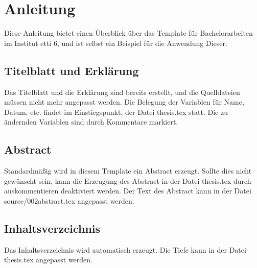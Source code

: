 \chapter{Anleitung} 

Diese Anleitung bietet einen Überblick über das Template für Bachelorarbeiten im Institut etti 6, und ist selbst ein Beispiel für die Anwendung Dieser. 

\section{Titelblatt und Erklärung}\label{Titelblatt und Erklärung}

Das Titelblatt und die Erklärung sind bereits erstellt, und die Quelldateien müssen nicht mehr angepasst werden. Die Belegung der Variablen für Name, Datum, etc. findet im Einstiegspunkt, der Datei thesis.tex statt. Die zu ändernden Variablen sind durch Kommentare markiert.

\section{Abstract}\label{Abstract}

Standardmäßig wird in diesem Template ein Abstract erzeugt. Sollte dies nicht gewünscht sein, kann die Erzeugung des Abstract in der Datei thesis.tex durch auskommentieren deaktiviert werden. Der Text des Abstract kann in der Datei source\slash002\textunderscore abstract.tex angepasst werden.

\section{Inhaltsverzeichnis}\label{Inhaltsverzeichnis}

Das Inhaltsverzeichnis wird automatisch erzeugt. Die Tiefe kann in der Datei thesis.tex angepasst werden.

